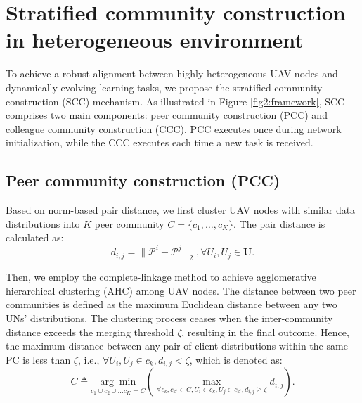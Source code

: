 \documentclass[lettersize,journal]{IEEEtran}
\begin{document}
\section{Stratified community construction in heterogeneous environment}\label{sec:community}
To achieve a robust alignment between highly heterogeneous UAV nodes and dynamically evolving learning tasks, we propose the stratified community construction (SCC) mechanism. As illustrated in Figure \ref{fig2:framework}, SCC comprises two main components: peer community construction (PCC) and colleague community construction (CCC). PCC executes once during network initialization, while the CCC executes each time a new task is received.
\subsection{Peer community construction (PCC)}
Based on norm-based pair distance, we first cluster UAV nodes with similar data distributions into $K$ peer community $C=\{ c_{1}, \ldots, c_{K} \}$. The pair distance is calculated as:
\begin{equation}
d_{i,j}=\lVert \mathcal{P}^{i}-\mathcal{P}^{j} \rVert_{2}, \forall U_i,U_j\in \mathbf{U}.
\end{equation}

Then, we employ the complete-linkage method to achieve agglomerative hierarchical clustering (AHC) among UAV nodes. The distance between two peer communities is defined as the maximum Euclidean distance between any two UNs' distributions. The clustering process ceases when the inter-community distance exceeds the merging threshold $\zeta$, resulting in the final outcome. Hence, the maximum distance between any pair of client distributions within the same PC is less than $\zeta$, i.e., $\forall U_i, U_j \in c_k, d_{i,j} < \zeta$, which is denoted as:
\begin{equation}\label{eq:peer-construct}
 C\triangleq \underset{c_{1} \cup c_{2} \cup \ldots c_{K}=C}{\arg \min} \left(\max _{\forall c_{k},c_{k'} \in C ,U_i \in c_{k}, U_j \in c_{k'},d_{i, j}\geq\zeta} d_{i, j}\right) .
\end{equation}
\end{document}
